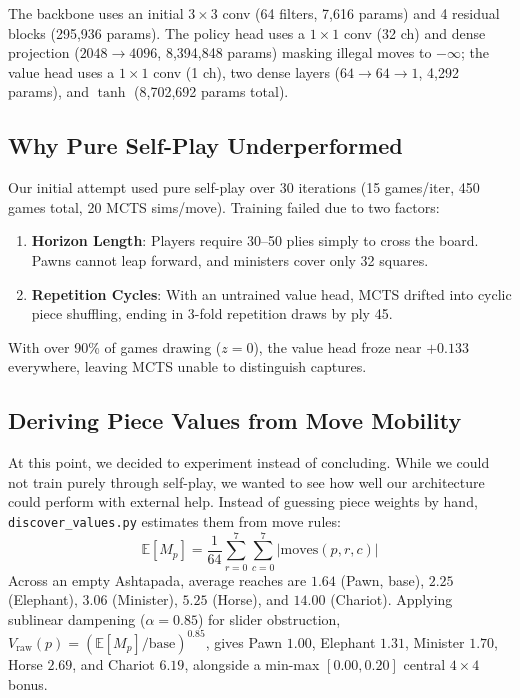 \documentclass[11pt,a4paper,twocolumn]{article}
\begin{document}
The backbone uses an initial $3 \times 3$ conv (64 filters, 7,616 params) and 4 residual blocks (295,936 params). The policy head uses a $1 \times 1$ conv (32 ch) and dense projection ($2048 \to 4096$, 8,394,848 params) masking illegal moves to $-\infty$; the value head uses a $1 \times 1$ conv (1 ch), two dense layers ($64 \to 64 \to 1$, 4,292 params), and $\tanh$ (8,702,692 params total).

\subsection{Why Pure Self-Play Underperformed}
Our initial attempt used pure self-play over 30 iterations (15 games/iter, 450 games total, 20 MCTS sims/move). Training failed due to two factors:
\begin{enumerate}
    \item \textbf{Horizon Length}: Players require 30--50 plies simply to cross the board. Pawns cannot leap forward, and ministers cover only 32 squares.
    \item \textbf{Repetition Cycles}: With an untrained value head, MCTS drifted into cyclic piece shuffling, ending in 3-fold repetition draws by ply 45.
\end{enumerate}
With over 90\% of games drawing ($z = 0$), the value head froze near $+0.133$ everywhere, leaving MCTS unable to distinguish captures.

\subsection{Deriving Piece Values from Move Mobility}
At this point, we decided to experiment instead of concluding. While we could not train purely through self-play, we wanted to see how well our architecture could perform with external help. Instead of guessing piece weights by hand, \texttt{discover\_values.py} estimates them from move rules:
\begin{equation}
\mathbb{E}[M_p] = \frac{1}{64} \sum_{r=0}^{7} \sum_{c=0}^{7} |\text{moves}(p, r, c)|
\end{equation}
Across an empty Ashtapada, average reaches are $1.64$ (Pawn, base), $2.25$ (Elephant), $3.06$ (Minister), $5.25$ (Horse), and $14.00$ (Chariot). Applying sublinear dampening ($\alpha = 0.85$) for slider obstruction, $V_{\text{raw}}(p) = (\mathbb{E}[M_p]/\text{base})^{0.85}$, gives Pawn $1.00$, Elephant $1.31$, Minister $1.70$, Horse $2.69$, and Chariot $6.19$, alongside a min-max $[0.00, 0.20]$ central $4 \times 4$ bonus.
\end{document}
